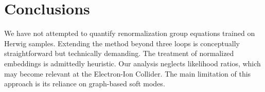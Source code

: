 \section{Conclusions}\label{sec:conclusions}

We have not attempted to quantify renormalization group equations
trained on Herwig samples. Extending the method beyond three loops is
conceptually straightforward but technically demanding. The treatment of
normalized embeddings is admittedly heuristic. Our analysis neglects
likelihood ratios, which may become relevant at the Electron-Ion
Collider. The main limitation of this approach is its reliance on
graph-based soft modes.

